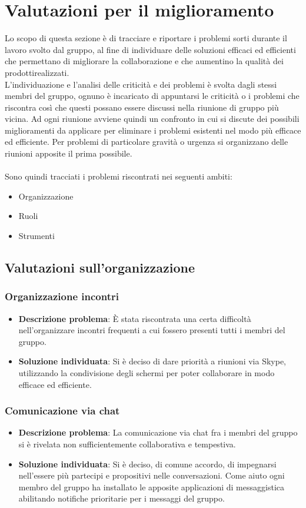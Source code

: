 \section{Valutazioni per il miglioramento} 
Lo scopo di questa sezione è di tracciare e riportare i problemi sorti durante il lavoro svolto dal gruppo, al fine di individuare delle soluzioni efficaci ed efficienti che permettano di migliorare la collaborazione e che aumentino la qualità dei prodotti\glosp realizzati.
\\L'individuazione e l'analisi delle criticità e dei problemi è svolta dagli stessi membri del gruppo, ognuno è incaricato di appuntarsi le criticità o i problemi che riscontra così che questi possano essere discussi nella riunione di gruppo più vicina. Ad ogni riunione avviene quindi un confronto in cui si discute dei possibili miglioramenti da applicare per eliminare i problemi esistenti nel modo più efficace ed efficiente. Per problemi di particolare gravità o urgenza si organizzano delle riunioni apposite il prima possibile.
\\ \\Sono quindi tracciati i problemi riscontrati nei seguenti ambiti:

\begin{itemize}
	\item Organizzazione
	\item Ruoli
	\item Strumenti
\end{itemize}

\subsection{Valutazioni sull'organizzazione}
	\subsubsection{Organizzazione incontri}
		\begin{itemize}
			\item \textbf{Descrizione problema}: È stata riscontrata una certa difficoltà nell'organizzare incontri frequenti a cui fossero presenti tutti i membri del gruppo.
			\item \textbf{Soluzione individuata}: Si è deciso di dare priorità a riunioni via Skype, utilizzando la condivisione degli schermi per poter collaborare in modo efficace ed efficiente.
		\end{itemize}
		\subsubsection{Comunicazione via chat}
			\begin{itemize}
			\item \textbf{Descrizione problema}: La comunicazione via chat fra i membri del gruppo si è rivelata non sufficientemente collaborativa e tempestiva.
			\item \textbf{Soluzione individuata}: Si è deciso, di comune accordo, di impegnarsi nell'essere più partecipi e propositivi nelle conversazioni. Come aiuto ogni membro del gruppo ha installato le apposite applicazioni di messaggistica abilitando notifiche prioritarie per i messaggi del gruppo.
			\end{itemize}
